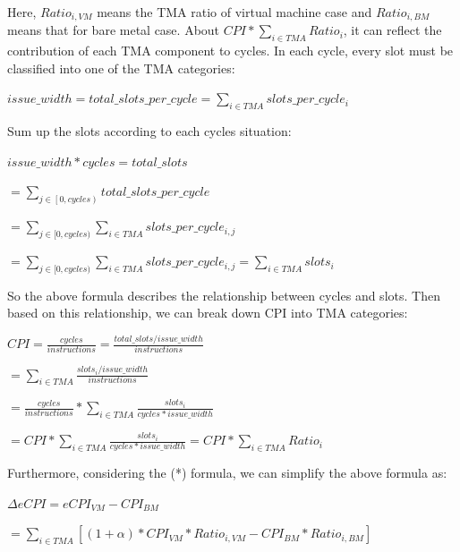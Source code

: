 \documentclass[12pt]{article}
\newcommand{\npar}[1]{#1\par}
\newcommand{\dmath}[1]{{\centering $\displaystyle #1$\par}}
\newcommand{\emptypar}{\mbox{}\par}
\begin{document}
\emptypar
\npar{\hspace*{9.60pt}Here, $\mathit{Rati}{\mathit{o}}_{\mathit{i},\mathit{VM}}$ means the TMA ratio of virtual machine case and $\mathit{Rati}{\mathit{o}}_{\mathit{i},\mathit{BM}}$ means that for bare metal case. About $\mathit{CPI}*\sum\limits_{\mathit{i}\in \mathit{TMA}}{\mathit{Rati}{\mathit{o}}_{\mathit{i}}}$, it can reflect the contribution of each TMA component to cycles. In each cycle, every slot must be classified into one of the TMA categories:}
\dmath{\mathit{issue\_width}=\mathit{total\_slots\_per\_cycle}=\sum\limits_{\mathit{i}\in \mathit{TMA}}{\mathit{slots\_per\_cycl}{\mathit{e}}_{\mathit{i}}}}
\npar{\hspace*{9.60pt}Sum up the slots according to each cycle\textquotesingle{}s situation:}
\dmath{\mathit{issue\_width}*\mathit{cycles}=\mathit{total\_slots}}
\dmath{=\sum\limits_{\mathit{j}\in \left[ 0,\mathit{cycles} \right)}{\mathit{total\_slots\_per\_cycle}}}
\dmath{=\sum\limits_{\mathit{j}\in [0,\mathit{cycles})}{\sum\limits_{\mathit{i}\in \mathit{TMA}}{\mathit{slots\_per\_cycl}{\mathit{e}}_{\mathit{i},\mathit{j}}}}}
\dmath{=\sum\limits_{\mathit{j}\in [0,\mathit{cycles})}{\sum\limits_{\mathit{i}\in \mathit{TMA}}{\mathit{slots\_per\_cycl}{\mathit{e}}_{\mathit{i},\mathit{j}}}}=\sum\limits_{\mathit{i}\in \mathit{TMA}}{\mathit{slot}{\mathit{s}}_{\mathit{i}}}}
\npar{\hspace*{9.60pt}So the above formula describes the relationship between cycles and slots. Then based on this relationship, we can break down CPI into TMA categories:}
\dmath{\mathit{CPI}=\frac{\mathit{cycles}}{\mathit{instructions}}=\frac{{\mathit{total\_slots}}/{\mathit{issue\_width}}}{\mathit{instructions}}}
\dmath{=\sum\limits_{\mathit{i}\in \mathit{TMA}}{\frac{{\mathit{slot}{\mathit{s}}_{\mathit{i}}}/{\mathit{issue\_width}}}{\mathit{instructions}}}}
\dmath{=\frac{\mathit{cycles}}{\mathit{instructions}}*\sum\limits_{\mathit{i}\in \mathit{TMA}}{\frac{\mathit{slot}{\mathit{s}}_{\mathit{i}}}{\mathit{cycles}*\mathit{issue\_width}}}}
\dmath{=\mathit{CPI}*\sum\limits_{\mathit{i}\in \mathit{TMA}}{\frac{\mathit{slot}{\mathit{s}}_{\mathit{i}}}{\mathit{cycles}*\mathit{issue\_width}}=\mathit{CPI}*\sum\limits_{\mathit{i}\in \mathit{TMA}}{\mathit{Rati}{\mathit{o}}_{\mathit{i}}}}}
\npar{\hspace*{4\fontdimen2\font}Furthermore, considering the (*) formula, we can simplify the above formula as:}
\dmath{\Delta \mathit{eCPI}=\mathit{eCP}{\mathit{I}}_{\mathit{VM}}-\mathit{CP}{\mathit{I}}_{\mathit{BM}}}
\dmath{=\sum\limits_{\mathit{i}\in \mathit{TMA}}{\left[ \left( 1+\alpha  \right)*\mathit{CP}{\mathit{I}}_{\mathit{VM}}*\mathit{Rati}{\mathit{o}}_{\mathit{i},\mathit{VM}}-\mathit{CP}{\mathit{I}}_{\mathit{BM}}*\mathit{Rati}{\mathit{o}}_{\mathit{i},\mathit{BM}} \right]}}
\end{document}
